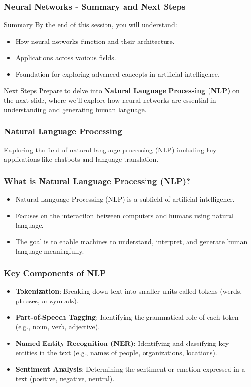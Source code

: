 \documentclass[aspectratio=169]{beamer}
\begin{document}
\begin{frame}[fragile]
    \frametitle{Neural Networks - Summary and Next Steps}
    \begin{block}{Summary}
        By the end of this session, you will understand:
        \begin{itemize}
            \item How neural networks function and their architecture.
            \item Applications across various fields.
            \item Foundation for exploring advanced concepts in artificial intelligence.
        \end{itemize}
    \end{block}

    \begin{block}{Next Steps}
        Prepare to delve into \textbf{Natural Language Processing (NLP)} on the next slide, where we’ll explore how neural networks are essential in understanding and generating human language.
    \end{block}
\end{frame}

\begin{frame}
    \frametitle{Natural Language Processing}
    Exploring the field of natural language processing (NLP) including key applications like chatbots and language translation.
\end{frame}

\begin{frame}
    \frametitle{What is Natural Language Processing (NLP)?}
    \begin{itemize}
        \item Natural Language Processing (NLP) is a subfield of artificial intelligence.
        \item Focuses on the interaction between computers and humans using natural language.
        \item The goal is to enable machines to understand, interpret, and generate human language meaningfully.
    \end{itemize}
\end{frame}

\begin{frame}
    \frametitle{Key Components of NLP}
    \begin{itemize}
        \item \textbf{Tokenization}: Breaking down text into smaller units called tokens (words, phrases, or symbols).
        \item \textbf{Part-of-Speech Tagging}: Identifying the grammatical role of each token (e.g., noun, verb, adjective).
        \item \textbf{Named Entity Recognition (NER)}: Identifying and classifying key entities in the text (e.g., names of people, organizations, locations).
        \item \textbf{Sentiment Analysis}: Determining the sentiment or emotion expressed in a text (positive, negative, neutral).
    \end{itemize}
\end{frame}
\end{document}
